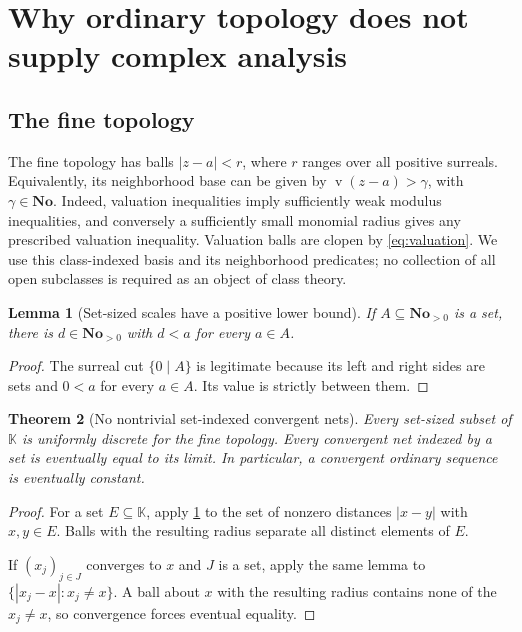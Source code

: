 \documentclass[11pt,letterpaper]{article}
\numberwithin{equation}{section}
\newtheorem{theorem}{Theorem}[section]
\newtheorem{lemma}[theorem]{Lemma}
\theoremstyle{definition}
\theoremstyle{remark}
\newcommand{\No}{\mathbf{No}}
\newcommand{\K}{\mathbb{K}}
\newcommand{\val}{\operatorname{v}}
\begin{document}
\section{Why ordinary topology does not supply complex analysis}\label{sec:topology}

\subsection{The fine topology}

The fine topology has balls $|z-a|<r$, where $r$ ranges over all positive
surreals. Equivalently, its neighborhood base can be given by
$\val(z-a)>\gamma$, with $\gamma\in\No$. Indeed, valuation inequalities
imply sufficiently weak modulus inequalities, and conversely a sufficiently
small monomial radius gives any prescribed valuation inequality.
Valuation balls are clopen by \eqref{eq:valuation}. We use this
class-indexed basis and its neighborhood predicates; no collection of all
open subclasses is required as an object of class theory.

\begin{lemma}[Set-sized scales have a positive lower bound]\label{lem:setlower}
If $A\subseteq\No_{>0}$ is a set, there is $d\in\No_{>0}$ with $d<a$ for
every $a\in A$.
\end{lemma}
\begin{proof}
The surreal cut $\{0\mid A\}$ is legitimate because its left and right sides
are sets and $0<a$ for every $a\in A$. Its value is strictly between them.
\end{proof}

\begin{theorem}[No nontrivial set-indexed convergent nets]\label{thm:nets}
Every set-sized subset of $\K$ is uniformly discrete for the fine topology.
Every convergent net indexed by a set is eventually equal to its limit.
In particular, a convergent ordinary sequence is eventually constant.
\end{theorem}
\begin{proof}
For a set $E\subseteq\K$, apply \cref{lem:setlower} to the set of nonzero
distances $|x-y|$ with $x,y\in E$. Balls with the resulting radius separate
all distinct elements of $E$.

If $(x_j)_{j\in J}$ converges to $x$ and $J$ is a set, apply the same lemma to
$\{|x_j-x|:x_j\ne x\}$. A ball about $x$ with the resulting radius contains
none of the $x_j\ne x$, so convergence forces eventual equality.
\end{proof}
\end{document}
